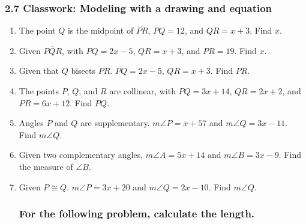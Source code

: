 \documentclass[12pt, twoside]{article}
\begin{document}
  \subsubsection*{2.7 Classwork: Modeling with a drawing and equation}
  \begin{enumerate}
    \subsubsection*{Do Not Solve! Make a drawing on the right, an equation to the left, and circle where it states what to find.}
    \vspace{0.5cm}

\item The point $Q$ is the midpoint of $\overline{PR}$, $PQ=12$, and $QR=x+3$. Find ${x}$.
\vspace{4cm}

\item Given $\overline{PQR}$, with $PQ=2x-5$, $QR=x+3$, and $PR=19$. Find ${x}$.
\vspace{4cm}

\item Given that $Q$ bisects $\overline{PR}$. $PQ=2x-5$, $QR=x+3$. Find ${PR}$.
\vspace{4cm}

\item The points $P$, $Q$, and $R$ are collinear, with $PQ=3x+14$, $QR=2x+2$, and $PR=6x+12$. Find ${PQ}$.
\vspace{4cm}

\newpage

\item Angles $P$ and $Q$ are supplementary. $m\angle P = x+57$ and $m\angle Q = 3x-11$. Find $m\angle Q$. \vspace{3.5cm} 

\item Given two complementary angles, $m\angle A = 5x+14$ and $m\angle B = 3x-9$. Find the measure of $\angle B$. \vspace{3.5cm} 

\item Given $P \cong Q$. $m\angle P = 3x+20$ and $m\angle Q = 2x-10$. Find $m\angle Q$. \vspace{3.5cm} 

\subsubsection*{For the following problem, calculate the length.}


\end{enumerate}
\end{document}
